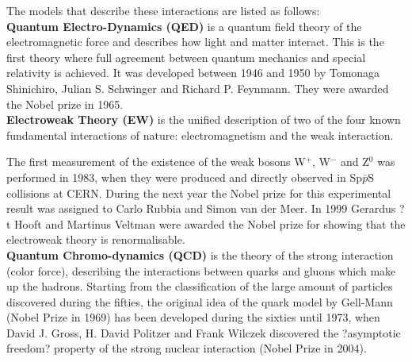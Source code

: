 
The models that describe these interactions are listed as follows: \\

\textbf{Quantum Electro-Dynamics (QED)} is a quantum field theory of the electromagnetic force and describes how light and matter interact. This is the first theory where full agreement between quantum mechanics and special relativity is achieved. It was developed between 1946 and 1950 by Tomonaga Shinichiro, Julian S. Schwinger and Richard P. Feynmann. They were awarded the Nobel prize in 1965. \\

\textbf{Electroweak Theory (EW)} is the unified description of two of the four known fundamental interactions of nature: electromagnetism and the weak interaction. 

The first measurement of the existence of the weak bosons W$^{+}$, W$^{-}$ and Z$^{0}$ was performed in 1983, when they were produced and directly observed in Sp$\bar{p}$S collisions at CERN. During the next year the Nobel prize for this experimental result was assigned to Carlo Rubbia and Simon van der Meer. In 1999 Gerardus ?t Hooft and Martinus Veltman were awarded the Nobel prize for showing that the electroweak theory is renormalisable. \\

\textbf{Quantum Chromo-dynamics (QCD)} is the theory of the strong interaction (color force), describing the interactions between quarks and gluons which make up the hadrons. Starting from the classification of the large amount of particles discovered during the fifties, the original idea of the quark model by Gell-Mann (Nobel Prize in 1969) has been developed during the sixties until 1973, when David J. Gross, H. David Politzer and Frank Wilczek discovered the ?asymptotic freedom? property of the strong nuclear interaction (Nobel Prize in 2004).

